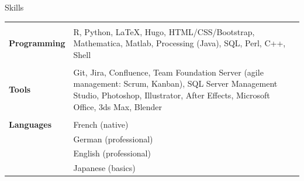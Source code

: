 \documentclass[a4paper,11pt,oneside]{article}
\begin{document}
\vspace{1em}
   
\noindent \begin{Large}Skills\end{Large}
\noindent \begin{longtable}{@{}p{3.1cm}@{}@{}p{13.9cm}@{}}
   & \\
   \textbf{Programming} & R, Python, LaTeX, Hugo, HTML/CSS/Bootstrap, Mathematica, Matlab, Processing (Java), SQL, Perl, C++, Shell \\
   & \\   
   \textbf{Tools} & Git, Jira, Confluence, Team Foundation Server (agile management: Scrum, Kanban), SQL Server Management Studio, Photoshop, Illustrator, After Effects, Microsoft Office, 3ds Max, Blender \\
   & \\   
   \textbf{Languages} & French (native) \\
   & German (professional) \\
   & English (professional) \\
   & Japanese (basics)
\end{longtable}

\vspace{1em}

\noindent {\color{gray}\hrule} 
   
\vspace{1em}
   
\end{document}
